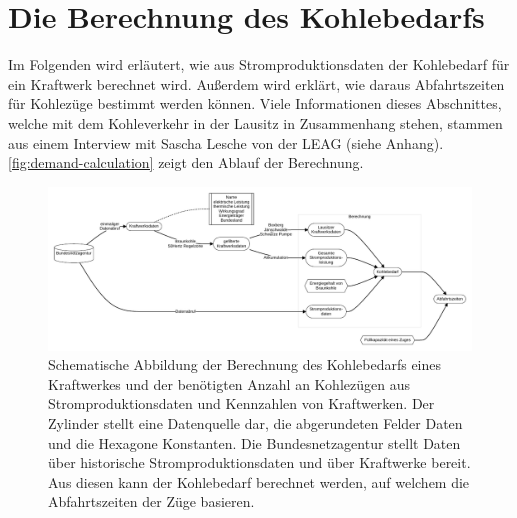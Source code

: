 \section{Die Berechnung des Kohlebedarfs}

Im Folgenden wird erläutert, wie aus Stromproduktionsdaten der Kohlebedarf für ein Kraftwerk berechnet wird. Außerdem wird erklärt, wie daraus Abfahrtszeiten für Kohlezüge bestimmt werden können. Viele Informationen dieses Abschnittes, welche mit dem Kohleverkehr in der Lausitz in Zusammenhang stehen, stammen aus einem Interview mit Sascha Lesche von der LEAG (siehe Anhang). \autoref{fig:demand-calculation} zeigt den Ablauf der Berechnung.

\begin{figure}
	\centering
	\includegraphics[width=1.0\linewidth]{images/diagrams/demand-calculation.pdf}
	\caption{Schematische Abbildung der Berechnung des Kohlebedarfs eines Kraftwerkes und der benötigten Anzahl an Kohlezügen aus Stromproduktionsdaten und Kennzahlen von Kraftwerken. Der Zylinder stellt eine Datenquelle dar, die abgerundeten Felder Daten und die Hexagone Konstanten. Die Bundesnetzagentur stellt Daten über historische Stromproduktionsdaten und über Kraftwerke bereit. Aus diesen kann der Kohlebedarf berechnet werden, auf welchem die Abfahrtszeiten der Züge basieren.}
	\label{fig:demand-calculation}
\end{figure}


